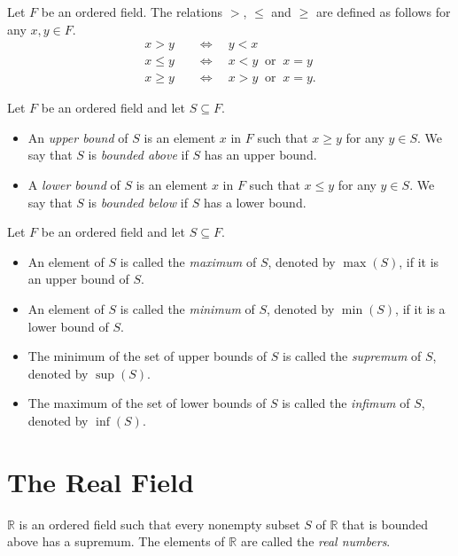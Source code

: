 \begin{definition}
  Let $F$ be an ordered field.
  The relations $>$, $\leq$ and $\geq$ are defined as follows for any
  $x, y \in F$.
  \begin{align*}
    x > y \quad &\Leftrightarrow \quad y < x \\
    x \leq y \quad &\Leftrightarrow \quad x < y \;\;\text{or}\;\; x = y \\
    x \geq y \quad &\Leftrightarrow \quad x > y \;\;\text{or}\;\; x = y.
  \end{align*}
\end{definition}

\begin{definition}
  Let $F$ be an ordered field and let $S \subseteq F$.
  \begin{itemize}
    \item An \emph{upper bound} of $S$ is an element $x$ in $F$ such that
    $x \geq y$ for any $y \in S$.
    We say that $S$ is \emph{bounded above} if $S$ has an upper bound.
    \item A \emph{lower bound} of $S$ is an element $x$ in $F$ such that
    $x \leq y$ for any $y \in S$.
    We say that $S$ is \emph{bounded below} if $S$ has a lower bound.
  \end{itemize}
\end{definition}

\begin{definition}
  Let $F$ be an ordered field and let $S \subseteq F$.
  \begin{itemize}
    \item An element of $S$ is called the \emph{maximum} of $S$, denoted by
    $\max(S)$, if it is an upper bound of $S$.
    \item An element of $S$ is called the \emph{minimum} of $S$, denoted by
    $\min(S)$, if it is a lower bound of $S$.
    \item The minimum of the set of upper bounds of $S$ is called the
    \emph{supremum} of $S$, denoted by $\sup(S)$.
    \item The maximum of the set of lower bounds of $S$ is called the
    \emph{infimum} of $S$, denoted by $\inf(S)$.
  \end{itemize}
\end{definition}

\section{The Real Field}
\begin{definition}
  $\mathbb{R}$ is an ordered field such that every nonempty subset $S$ of
  $\mathbb{R}$ that is bounded above has a supremum.
  The elements of $\mathbb{R}$ are called the \emph{real numbers}.
\end{definition}

